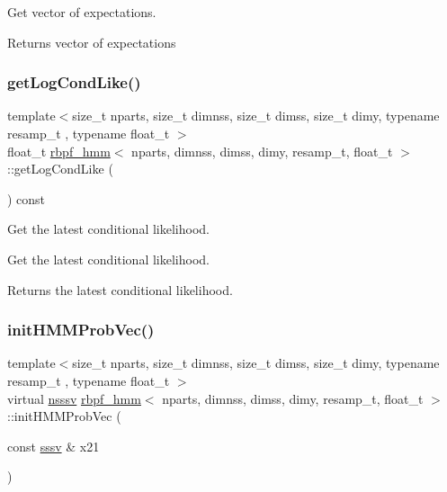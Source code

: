 Get vector of expectations. 

\begin{DoxyReturn}{Returns}
vector of expectations 
\end{DoxyReturn}
\mbox{\label{classrbpf__hmm_ae0f486583c4c07f9bc97dd6288119889}} 
\subsubsection{\texorpdfstring{get\+Log\+Cond\+Like()}{getLogCondLike()}}
{\footnotesize\ttfamily template$<$size\+\_\+t nparts, size\+\_\+t dimnss, size\+\_\+t dimss, size\+\_\+t dimy, typename resamp\+\_\+t , typename float\+\_\+t $>$ \\
float\+\_\+t \hyperlink{classrbpf__hmm}{rbpf\+\_\+hmm}$<$ nparts, dimnss, dimss, dimy, resamp\+\_\+t, float\+\_\+t $>$\+::get\+Log\+Cond\+Like (\begin{DoxyParamCaption}{ }\end{DoxyParamCaption}) const}



Get the latest conditional likelihood. 

Get the latest conditional likelihood. \begin{DoxyReturn}{Returns}
the latest conditional likelihood. 
\end{DoxyReturn}
\mbox{\label{classrbpf__hmm_a3944acc8066774eaa0ff4330301447a1}} 
\subsubsection{\texorpdfstring{init\+H\+M\+M\+Prob\+Vec()}{initHMMProbVec()}}
{\footnotesize\ttfamily template$<$size\+\_\+t nparts, size\+\_\+t dimnss, size\+\_\+t dimss, size\+\_\+t dimy, typename resamp\+\_\+t , typename float\+\_\+t $>$ \\
virtual \hyperlink{classrbpf__hmm_a7988465662f94f2ba45fd22566828d0f}{nsssv} \hyperlink{classrbpf__hmm}{rbpf\+\_\+hmm}$<$ nparts, dimnss, dimss, dimy, resamp\+\_\+t, float\+\_\+t $>$\+::init\+H\+M\+M\+Prob\+Vec (\begin{DoxyParamCaption}\item[{const \hyperlink{classrbpf__hmm_a28e8ad1d93bcf53cb74603f74826a81c}{sssv} \&}]{x21 }\end{DoxyParamCaption})\hspace{0.3cm}{\ttfamily [pure virtual]}}



